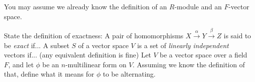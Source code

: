 \documentclass{exam}
\begin{document}
\begin{center}
\end{center}

\vspace*{1em}
You may assume we already know the definition of an $R$-module and an $F$-vector space.
\begin{questions}
    \question[2]
        State the definition of exactness: A pair of homomorphisms $X\stackrel{\alpha}{\to}Y\stackrel{\beta}{\to}Z$ is said to 
        be \textit{exact} if...
        \vspace*{7cm}
    \question[2]
        A subset $S$ of a vector space $V$ is a set of \textit{linearly independent} vectors if... (any equivalent definition is fine)
        \vspace*{7cm}
    \question[1]
        Let $V$ be a vector space over a field $F$, and let $\phi$ be an $n$-multilinear form on $V$. Assuming we know the definition of that, define what it means for $\phi$ to be alternating.
\end{questions}
\end{document}
